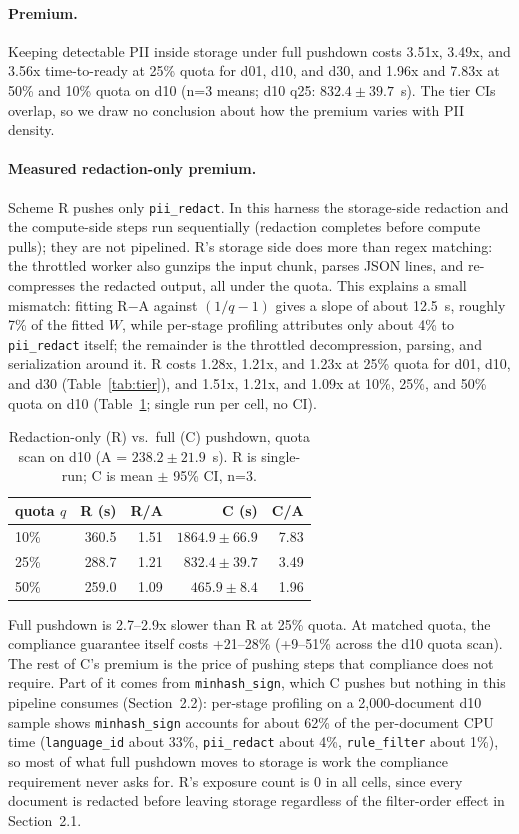 \documentclass[11pt]{article}
\begin{document}
\paragraph{Premium.} Keeping detectable PII inside storage under full pushdown costs 3.51x, 3.49x, and 3.56x time-to-ready at 25\% quota for d01, d10, and d30, and 1.96x and 7.83x at 50\% and 10\% quota on d10 (n=3 means; d10 q25: $832.4 \pm 39.7$~s). The tier CIs overlap, so we draw no conclusion about how the premium varies with PII density.

\paragraph{Measured redaction-only premium.} Scheme R pushes only \texttt{pii\_redact}. In this harness the storage-side redaction and the compute-side steps run sequentially (redaction completes before compute pulls); they are not pipelined. R's storage side does more than regex matching: the throttled worker also gunzips the input chunk, parses JSON lines, and re-compresses the redacted output, all under the quota. This explains a small mismatch: fitting R$-$A against $(1/q-1)$ gives a slope of about 12.5~s, roughly 7\% of the fitted $W$, while per-stage profiling attributes only about 4\% to \texttt{pii\_redact} itself; the remainder is the throttled decompression, parsing, and serialization around it. R costs 1.28x, 1.21x, and 1.23x at 25\% quota for d01, d10, and d30 (Table~\ref{tab:tier}), and 1.51x, 1.21x, and 1.09x at 10\%, 25\%, and 50\% quota on d10 (Table~\ref{tab:rvc}; single run per cell, no CI).

\begin{table}[t]
\centering
\caption{Redaction-only (R) vs.\ full (C) pushdown, quota scan on d10 (A = $238.2 \pm 21.9$~s). R is single-run; C is mean $\pm$ 95\% CI, n=3.}
\label{tab:rvc}
\begin{tabular}{lrrrr}
\toprule
quota $q$ & R (s) & R/A & C (s) & C/A \\
\midrule
10\% & 360.5 & 1.51 & $1864.9 \pm 66.9$ & 7.83 \\
25\% & 288.7 & 1.21 & $832.4 \pm 39.7$ & 3.49 \\
50\% & 259.0 & 1.09 & $465.9 \pm 8.4$ & 1.96 \\
\bottomrule
\end{tabular}
\end{table}

Full pushdown is 2.7--2.9x slower than R at 25\% quota. At matched quota, the compliance guarantee itself costs +21--28\% (+9--51\% across the d10 quota scan). The rest of C's premium is the price of pushing steps that compliance does not require. Part of it comes from \texttt{minhash\_sign}, which C pushes but nothing in this pipeline consumes (Section~2.2): per-stage profiling on a 2,000-document d10 sample shows \texttt{minhash\_sign} accounts for about 62\% of the per-document CPU time (\texttt{language\_id} about 33\%, \texttt{pii\_redact} about 4\%, \texttt{rule\_filter} about 1\%), so most of what full pushdown moves to storage is work the compliance requirement never asks for. R's exposure count is 0 in all cells, since every document is redacted before leaving storage regardless of the filter-order effect in Section~2.1.
\end{document}
